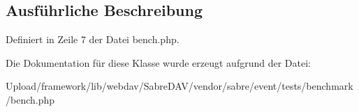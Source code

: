 \subsection{Ausführliche Beschreibung}


Definiert in Zeile 7 der Datei bench.\+php.



Die Dokumentation für diese Klasse wurde erzeugt aufgrund der Datei\+:\begin{DoxyCompactItemize}
\item 
Upload/framework/lib/webdav/\+Sabre\+D\+A\+V/vendor/sabre/event/tests/benchmark/bench.\+php\end{DoxyCompactItemize}
